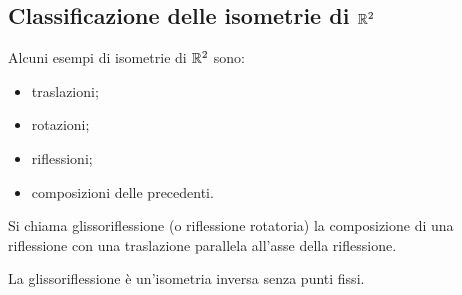\documentclass[a4paper,12pt]{article}
\newcommand{\Got}[1]{#1}
\newcommand{\got}[1]{{#1}}
\begin{document}
	\subsection{Classificazione delle isometrie di $\got{\R^2}$}
 
 \Got{Alcuni esempi di isometrie di} $\got{\R^2}$ \Got{sono:}
 \begin{itemize}
	\item \Got{traslazioni;}
	\item \Got{rotazioni;}
	\item \Got{riflessioni;}
	\item \Got{composizioni delle precedenti.}
 \end{itemize}
 
 \begin{definition}
 \Got{Si chiama glissoriflessione (o riflessione rotatoria) la composizione di una riflessione con una traslazione parallela
 all'asse della riflessione.}
 \end{definition}
 
 \begin{remark}
 \Got{La glissoriflessione è un'isometria inversa senza punti fissi.}
 \end{remark}
 
\end{document}

